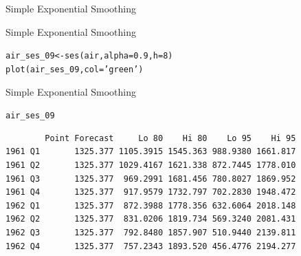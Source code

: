 \documentclass{beamer}\usepackage[]{graphicx}\usepackage[]{color}
\makeatletter
\newcommand{\hlnum}[1]{\textcolor[rgb]{0.824,0.412,0.118}{#1}}%
\newcommand{\hlstr}[1]{\textcolor[rgb]{1,0.894,0.71}{#1}}%
\newcommand{\hlstd}[1]{\textcolor[rgb]{1,0.894,0.769}{#1}}%
\newcommand{\hlkwb}[1]{\textcolor[rgb]{0.804,0.776,0.451}{#1}}%
\newcommand{\hlkwc}[1]{\textcolor[rgb]{0.78,0.941,0.545}{#1}}%
\newcommand{\hlkwd}[1]{\textcolor[rgb]{1,0.78,0.769}{#1}}%
\newenvironment{kframe}{%
 \def\at@end@of@kframe{}%
 \ifinner\ifhmode%
  \def\at@end@of@kframe{\end{minipage}}%
  \begin{minipage}{\columnwidth}%
 \fi\fi%
 \def\FrameCommand##1{\hskip\@totalleftmargin \hskip-\fboxsep
 \colorbox{shadecolor}{##1}\hskip-\fboxsep
     \hskip-\linewidth \hskip-\@totalleftmargin \hskip\columnwidth}%
 \MakeFramed {\advance\hsize-\width
   \@totalleftmargin\z@ \linewidth\hsize
   \@setminipage}}%
 {\par\unskip\endMakeFramed%
 \at@end@of@kframe}
\newenvironment{knitrout}{}{} %
\makeatother
\begin{document}
\begin{darkframes}
\begin{frame}[fragile]{Simple Exponential Smoothing}
    \end{frame} 
    
    
    
    \begin{frame}[fragile]{Simple Exponential Smoothing}
      \fontsize{8}{8}\selectfont
\begin{knitrout}
\begin{kframe}
\begin{alltt}
\hlstd{air_ses_09} \hlkwb{<-} \hlkwd{ses}\hlstd{(air,} \hlkwc{alpha} \hlstd{=} \hlnum{0.9}\hlstd{,} \hlkwc{h}\hlstd{=}\hlnum{8}\hlstd{)}
\hlkwd{plot}\hlstd{(air_ses_09,} \hlkwc{col}\hlstd{=}\hlstr{'green'}\hlstd{)}
\end{alltt}
\end{kframe}


\end{knitrout}
    \end{frame}
    
    \begin{frame}[fragile]{Simple Exponential Smoothing}
      \fontsize{8}{8}\selectfont
\begin{knitrout}
\begin{kframe}
\begin{alltt}
\hlstd{air_ses_09}
\end{alltt}
\begin{verbatim}
        Point Forecast     Lo 80    Hi 80    Lo 95    Hi 95
1961 Q1       1325.377 1105.3915 1545.363 988.9380 1661.817
1961 Q2       1325.377 1029.4167 1621.338 872.7445 1778.010
1961 Q3       1325.377  969.2991 1681.456 780.8027 1869.952
1961 Q4       1325.377  917.9579 1732.797 702.2830 1948.472
1962 Q1       1325.377  872.3988 1778.356 632.6064 2018.148
1962 Q2       1325.377  831.0206 1819.734 569.3240 2081.431
1962 Q3       1325.377  792.8480 1857.907 510.9440 2139.811
1962 Q4       1325.377  757.2343 1893.520 456.4776 2194.277
\end{verbatim}
\end{kframe}
\end{knitrout}
    \end{frame}
    

\end{darkframes}
\end{document}
